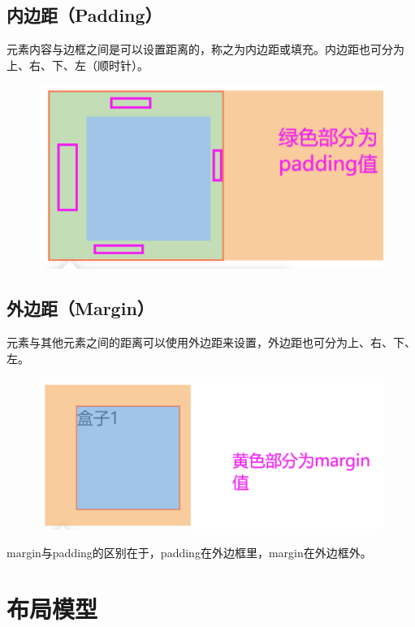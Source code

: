 \subsection{内边距（Padding）}

元素内容与边框之间是可以设置距离的，称之为内边距或填充。内边距也可分为上、右、下、左（顺时针）。

\begin{figure}[H]
	\centering
	\includegraphics[scale=0.7]{img/C8/8-2/3.png}
\end{figure}

\subsection{外边距（Margin）}

元素与其他元素之间的距离可以使用外边距来设置，外边距也可分为上、右、下、左。

\begin{figure}[H]
	\centering
	\includegraphics[scale=0.7]{img/C8/8-2/4.png}
\end{figure}

margin与padding的区别在于，padding在外边框里，margin在外边框外。

\newpage

\section{布局模型}

